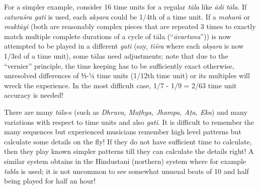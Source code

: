 For a simpler example, consider 16 time units for a regular \textsl{tāla} like \textsl{ādi tāla}. If \textsl{caturaśra gati} is used, each \textsl{akṣara} could be 1/4th of a time unit. If a \textsl{moharā} or \textsl{muktāyi} (both are reasonably complex pieces that are repeated 3 times to exactly match multiple complete durations of a cycle of tāla (“\textsl{āvartana}”)) is now attempted to be played in a different \textsl{gati} (say, \textsl{tiśra} where each \textsl{akṣara} is now 1/3rd of a time unit), some tālas need adjustments; note that due to the “vernier” principle, the time keeping has to be sufficiently exact otherwise, unresolved differences of ⅓-¼ time units (1/12th time unit) or its multiples will wreck the experience. In the most difficult case, 1/7 - 1/9 = 2/63 time unit accuracy is needed!

There are many \textsl{tāla}-s (such as \textsl{Dhruva, Maṭhya, Jhampa, Aṭa, Eka}) and many variations with respect to time units and also \textsl{gati}. It is difficult to remember the many sequences but experienced musicians remember high level patterns but calculate some details on the fly! If they do not have sufficient time to calculate, then they play known simpler patterns till they can calculate the details right! A similar system obtains in the Hindustani (northern) system where for example \textsl{tabla} is used; it is not uncommon to see somewhat unusual beats of 10 and half being played for half an hour! 

